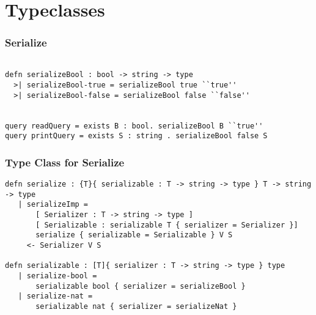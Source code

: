 \section{Typeclasses}
\begin{frame}[fragile]
\frametitle{Serialize}

\begin{lstlisting}

defn serializeBool : bool -> string -> type
  >| serializeBool-true = serializeBool true ``true''
  >| serializeBool-false = serializeBool false ``false''


query readQuery = exists B : bool. serializeBool B ``true''
query printQuery = exists S : string . serializeBool false S

\end{lstlisting}

\end{frame}

\begin{frame}[fragile]
\frametitle{Type Class for Serialize}

\begin{lstlisting}
defn serialize : {T}{ serializable : T -> string -> type } T -> string -> type
   | serializeImp = 
       [ Serializer : T -> string -> type ]
       [ Serializable : serializable T { serializer = Serializer }]
       serialize { serializable = Serializable } V S
     <- Serializer V S

defn serializable : [T]{ serializer : T -> string -> type } type
   | serialize-bool = 
       serializable bool { serializer = serializeBool }
   | serialize-nat = 
       serializable nat { serializer = serializeNat }
\end{lstlisting}

\end{frame}

